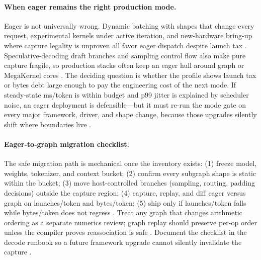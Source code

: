 \paragraph{When eager remains the right production mode.}
Eager is not universally wrong. Dynamic batching with shapes that change every request, experimental kernels under active iteration, and new-hardware bring-up where capture legality is unproven all favor eager dispatch despite launch tax \citep{kwon2023vllm,patel2025llminference}. Speculative-decoding draft branches and sampling control flow also make pure capture fragile, so production stacks often keep an eager hull around graph or MegaKernel cores \citep{nvidia2024cudagraphs,taxbreak2026}. The deciding question is whether the profile shows launch tax or bytes debt large enough to pay the engineering cost of the next mode. If steady-state ms/token is within budget and p99 jitter is explained by scheduler noise, an eager deployment is defensible---but it must re-run the mode gate on every major framework, driver, and shape change, because those upgrades silently shift where boundaries live \citep{memoryfloor2026,chen2020compilerbasedhardw,yirage2026}.

\paragraph{Eager-to-graph migration checklist.}
The safe migration path is mechanical once the inventory exists: (1) freeze model, weights, tokenizer, and context bucket; (2) confirm every subgraph shape is static within the bucket; (3) move host-controlled branches (sampling, routing, padding decisions) outside the capture region; (4) capture, replay, and diff eager versus graph on launches/token and bytes/token; (5) ship only if launches/token falls while bytes/token does not regress \citep{nvidia2024cudagraphs,memoryfloor2026,taxbreak2026}. Treat any graph that changes arithmetic ordering as a separate numerics review; graph replay should preserve per-op order unless the compiler proves reassociation is safe \citep{dao2022flashattention,patel2025llminference}. Document the checklist in the decode runbook so a future framework upgrade cannot silently invalidate the capture \citep{yirage2026,chen2020compilerbasedhardw}.

